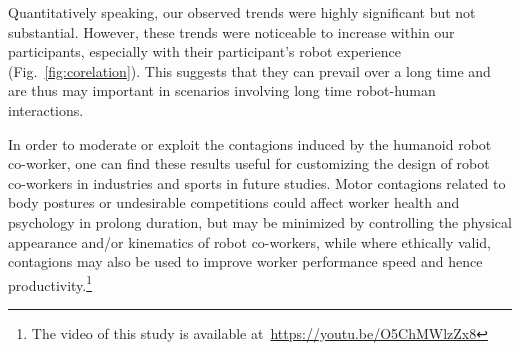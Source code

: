 Quantitatively speaking, our observed trends were highly significant but not substantial. However, these trends were noticeable to increase within our participants, especially with their participant's robot experience (Fig.~\ref{fig:corelation}). This suggests that they can prevail over a long time and are thus may important in scenarios involving long time robot-human interactions. 

In order to moderate or exploit the contagions induced by the humanoid robot co-worker, one can find these results useful for customizing the design of robot co-workers in industries and sports in future studies. Motor contagions related to body postures or undesirable competitions could affect worker health and psychology in prolong duration, but may be minimized by controlling the physical appearance and/or kinematics of robot co-workers, while where ethically valid, contagions may also be used to improve worker performance speed and hence productivity.\footnote{The video of this study is available at~\url{https://youtu.be/O5ChMWlzZx8}}


\clearpage %






